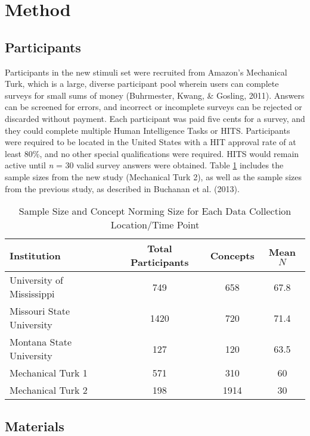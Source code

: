 \documentclass[english,,man]{apa6}
\theoremstyle{definition}
\theoremstyle{definition}
\theoremstyle{definition}
\theoremstyle{remark}
\begin{document}
\section{Method}\label{method}

\subsection{Participants}\label{participants}

Participants in the new stimuli set were recruited from Amazon's
Mechanical Turk, which is a large, diverse participant pool wherein
users can complete surveys for small sums of money (Buhrmester, Kwang,
\& Gosling, 2011). Answers can be screened for errors, and incorrect or
incomplete surveys can be rejected or discarded without payment. Each
participant was paid five cents for a survey, and they could complete
multiple Human Intelligence Tasks or HITS. Participants were required to
be located in the United States with a HIT approval rate of at least
80\%, and no other special qualifications were required. HITS would
remain active until \emph{n} = 30 valid survey answers were obtained.
Table \ref{tab:part-table} includes the sample sizes from the new study
(Mechanical Turk 2), as well as the sample sizes from the previous
study, as described in Buchanan et al. (2013).

\begin{table}[tbp]
\begin{center}
\begin{threeparttable}
\caption{\label{tab:part-table}Sample Size and Concept Norming Size for Each Data Collection Location/Time Point}
\begin{tabular}{lccc}
\toprule
Institution & Total Participants & Concepts & Mean $N$\\
\midrule
University of Mississippi & 749 & 658 & 67.8\\
Missouri State University & 1420 & 720 & 71.4\\
Montana State University & 127 & 120 & 63.5\\
Mechanical Turk 1 & 571 & 310 & 60\\
Mechanical Turk 2 & 198 & 1914 & 30\\
\bottomrule
\end{tabular}
\end{threeparttable}
\end{center}
\end{table}

\subsection{Materials}\label{materials}
\end{document}
